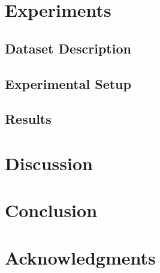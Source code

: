 \documentclass{article}
\begin{document}
\section{Experiments}


\subsection{Dataset Description}


\subsection{Experimental Setup}


\subsection{Results}


\section{Discussion}


\section{Conclusion}


\section*{Acknowledgments}



\end{document}
